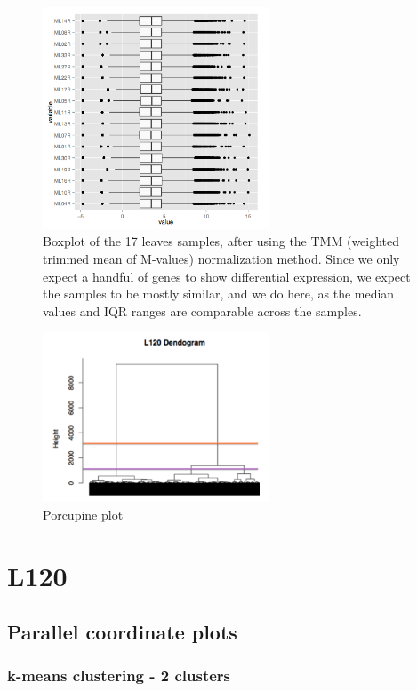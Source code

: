 \documentclass[11pt,a4paper,oldfontcommands,openany]{memoir}
\numberwithin{equation}{section} %
\begin{document}
\begin{figure}[H]
    \centering
    \includegraphics[width=0.6\textwidth]{boxplotL120}
    \caption{Boxplot of the 17 leaves samples, after using the TMM (weighted trimmed mean of M-values) normalization method. Since we only expect a handful of genes to show differential expression, we expect the samples to be mostly similar, and we do here, as the median values and IQR ranges are comparable across the samples.}
    \label{fig:boxplotL120}
\end{figure}

\begin{figure}[H]
    \centering
    \includegraphics[width=0.6\textwidth]{dendogramL120}
    \caption{Porcupine plot}
    \label{fig:dendogramL120}
\end{figure}


\section{L120}
\subsection{Parallel coordinate plots}
\subsubsection{k-means clustering - 2 clusters}
\end{document}
